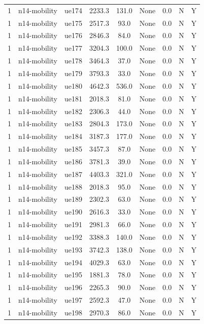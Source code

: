 \begin{table}[ht]
\begin{tabular}{|c|c|c|c|c|c|c|c|c|}
1 & n14-mobility & ue174 & 2233.3 & 131.0 & None & 0.0 & N & Y \\
1 & n14-mobility & ue175 & 2517.3 & 93.0 & None & 0.0 & N & Y \\
1 & n14-mobility & ue176 & 2846.3 & 84.0 & None & 0.0 & N & Y \\
1 & n14-mobility & ue177 & 3204.3 & 100.0 & None & 0.0 & N & Y \\
1 & n14-mobility & ue178 & 3464.3 & 37.0 & None & 0.0 & N & Y \\
1 & n14-mobility & ue179 & 3793.3 & 33.0 & None & 0.0 & N & Y \\
1 & n14-mobility & ue180 & 4642.3 & 536.0 & None & 0.0 & N & Y \\
1 & n14-mobility & ue181 & 2018.3 & 81.0 & None & 0.0 & N & Y \\
1 & n14-mobility & ue182 & 2306.3 & 44.0 & None & 0.0 & N & Y \\
1 & n14-mobility & ue183 & 2804.3 & 173.0 & None & 0.0 & N & Y \\
1 & n14-mobility & ue184 & 3187.3 & 177.0 & None & 0.0 & N & Y \\
1 & n14-mobility & ue185 & 3457.3 & 87.0 & None & 0.0 & N & Y \\
1 & n14-mobility & ue186 & 3781.3 & 39.0 & None & 0.0 & N & Y \\
1 & n14-mobility & ue187 & 4403.3 & 321.0 & None & 0.0 & N & Y \\
1 & n14-mobility & ue188 & 2018.3 & 95.0 & None & 0.0 & N & Y \\
1 & n14-mobility & ue189 & 2302.3 & 63.0 & None & 0.0 & N & Y \\
1 & n14-mobility & ue190 & 2616.3 & 33.0 & None & 0.0 & N & Y \\
1 & n14-mobility & ue191 & 2981.3 & 66.0 & None & 0.0 & N & Y \\
1 & n14-mobility & ue192 & 3388.3 & 140.0 & None & 0.0 & N & Y \\
1 & n14-mobility & ue193 & 3742.3 & 138.0 & None & 0.0 & N & Y \\
1 & n14-mobility & ue194 & 4029.3 & 63.0 & None & 0.0 & N & Y \\
1 & n14-mobility & ue195 & 1881.3 & 78.0 & None & 0.0 & N & Y \\
1 & n14-mobility & ue196 & 2265.3 & 90.0 & None & 0.0 & N & Y \\
1 & n14-mobility & ue197 & 2592.3 & 47.0 & None & 0.0 & N & Y \\
1 & n14-mobility & ue198 & 2970.3 & 86.0 & None & 0.0 & N & Y \\

\end{tabular}
\end{table}
